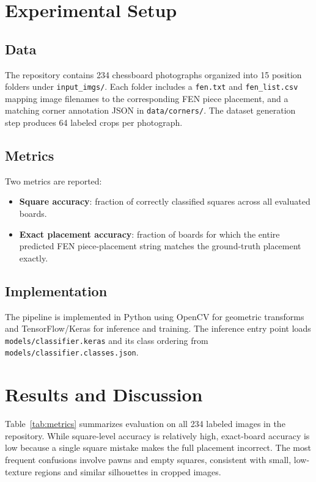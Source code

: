 \documentclass[conference]{IEEEtran}
\begin{document}
\section{Experimental Setup}
\subsection{Data}
The repository contains 234 chessboard photographs organized into 15 position folders under \texttt{input\_imgs/}. Each folder includes a \texttt{fen.txt} and \texttt{fen\_list.csv} mapping image filenames to the corresponding FEN piece placement, and a matching corner annotation JSON in \texttt{data/corners/}. The dataset generation step produces 64 labeled crops per photograph.

\subsection{Metrics}
Two metrics are reported:
\begin{itemize}
\item \textbf{Square accuracy}: fraction of correctly classified squares across all evaluated boards.
\item \textbf{Exact placement accuracy}: fraction of boards for which the entire predicted FEN piece-placement string matches the ground-truth placement exactly.
\end{itemize}

\subsection{Implementation}
The pipeline is implemented in Python using OpenCV for geometric transforms and TensorFlow/Keras for inference and training. The inference entry point loads \texttt{models/classifier.keras} and its class ordering from \texttt{models/classifier.classes.json}.

\section{Results and Discussion}
Table~\ref{tab:metrics} summarizes evaluation on all 234 labeled images in the repository. While square-level accuracy is relatively high, exact-board accuracy is low because a single square mistake makes the full placement incorrect. The most frequent confusions involve pawns and empty squares, consistent with small, low-texture regions and similar silhouettes in cropped images.
\end{document}
